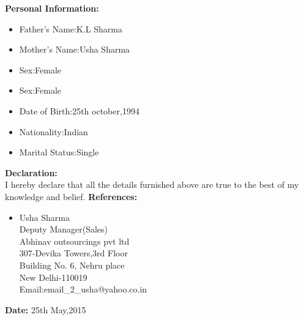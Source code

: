 \documentclass[10pt,a4paper]{article}
\begin{document}
\begin{flushleft}
		 \textbf{Personal Information:}\\
		 
		 \begin{itemize}
		 	\item Father's Name:K.L Sharma\\
		 	\item Mother's Name:Usha Sharma\\
		 	\item Sex:Female\\
		 	\item Sex:Female\\
		 	\item Date of Birth:25th october,1994\\
		 	\item Nationality:Indian\\
		 	\item Marital Status:Single\\
		 \end{itemize}
		   \textbf{ Declaration: }\\
		   I hereby declare that all the details furnished above are true to the best of my knowledge and belief.
		   \medskip
		   \textbf{ References: }\\
		   
		   \begin{itemize}
		   	\item Usha Sharma\\
		   	Deputy Manager(Sales) \\
		   	Abhinav outsourcings pvt ltd\\
		   	307-Devika Towers,3rd Floor\\
		   	Building No. 6, Nehru place\\
		   	New Delhi-110019\\
		   	Email:email\_2\_usha@yahoo.co.in
		   	
		   \end{itemize}
		    \textbf{ Date: }25th May,2015\\
	
\end{flushleft}

 
\end{document}
